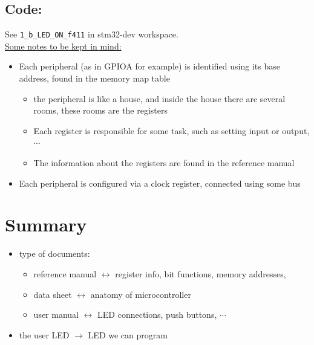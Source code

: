 \documentclass[12pt,a4paper]{book}
\begin{document}
\subsection{Code:}

See \verb|1_b_LED_ON_f411| in stm32-dev workspace.\\

\underline{Some notes to be kept in mind:}

\begin{itemize}

\item Each peripheral (as in GPIOA for example) is identified using its base address, found in the memory map table

    \begin{itemize}
        \item the peripheral is like a house, and inside the house there are several rooms, these rooms are the registers

        \item Each register is responsible for some task, such as setting input or output,$\cdots$

        \item The information about the registers are found in the reference manual
    \end{itemize}

\item  Each peripheral is configured via a clock register, connected using some bus

\end{itemize}


\newpage
\section{Summary}

\begin{itemize}

\item type of documents:

    \begin{itemize}
        \item reference manual $\leftrightarrow$ register info, bit functions, memory addresses,

        \item  data sheet $\leftrightarrow$ anatomy of microcontroller

        \item  user manual $\leftrightarrow$ LED connections, push buttons, $\cdots$
        
    \end{itemize}

\item the user LED $\rightarrow$ LED we can program

\end{itemize}
\end{document}
